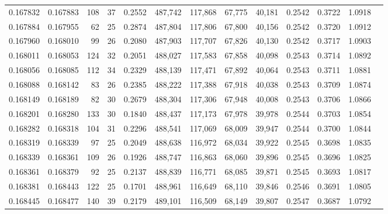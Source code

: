 \begin{tabular}{rrrrrrrrrrrrr}
0.167832 & 0.167883 &   108 &  37 &                                     0.2552 & 487,742 & 117,868 &  67,775 &  40,181 & 0.2542 & 0.3722 & 1.0918 \\
0.167884 & 0.167955 &    62 &  25 &                                     0.2874 & 487,804 & 117,806 &  67,800 &  40,156 & 0.2542 & 0.3720 & 1.0912 \\
0.167960 & 0.168010 &    99 &  26 &                                     0.2080 & 487,903 & 117,707 &  67,826 &  40,130 & 0.2542 & 0.3717 & 1.0903 \\
0.168011 & 0.168053 &   124 &  32 &                                     0.2051 & 488,027 & 117,583 &  67,858 &  40,098 & 0.2543 & 0.3714 & 1.0892 \\
0.168056 & 0.168085 &   112 &  34 &                                     0.2329 & 488,139 & 117,471 &  67,892 &  40,064 & 0.2543 & 0.3711 & 1.0881 \\
0.168088 & 0.168142 &    83 &  26 &                                     0.2385 & 488,222 & 117,388 &  67,918 &  40,038 & 0.2543 & 0.3709 & 1.0874 \\
0.168149 & 0.168189 &    82 &  30 &                                     0.2679 & 488,304 & 117,306 &  67,948 &  40,008 & 0.2543 & 0.3706 & 1.0866 \\
0.168201 & 0.168280 &   133 &  30 &                                     0.1840 & 488,437 & 117,173 &  67,978 &  39,978 & 0.2544 & 0.3703 & 1.0854 \\
0.168282 & 0.168318 &   104 &  31 &                                     0.2296 & 488,541 & 117,069 &  68,009 &  39,947 & 0.2544 & 0.3700 & 1.0844 \\
0.168319 & 0.168339 &    97 &  25 &                                     0.2049 & 488,638 & 116,972 &  68,034 &  39,922 & 0.2545 & 0.3698 & 1.0835 \\
0.168339 & 0.168361 &   109 &  26 &                                     0.1926 & 488,747 & 116,863 &  68,060 &  39,896 & 0.2545 & 0.3696 & 1.0825 \\
0.168361 & 0.168379 &    92 &  25 &                                     0.2137 & 488,839 & 116,771 &  68,085 &  39,871 & 0.2545 & 0.3693 & 1.0817 \\
0.168381 & 0.168443 &   122 &  25 &                                     0.1701 & 488,961 & 116,649 &  68,110 &  39,846 & 0.2546 & 0.3691 & 1.0805 \\
0.168445 & 0.168477 &   140 &  39 &                                     0.2179 & 489,101 & 116,509 &  68,149 &  39,807 & 0.2547 & 0.3687 & 1.0792 \\

\end{tabular}

